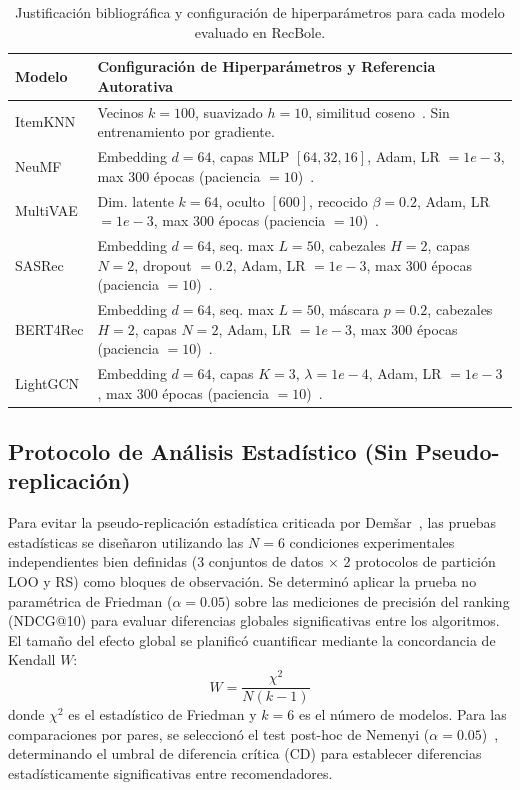 \documentclass[journal]{IEEEtran}
\makeatletter
\newcommand{\at}[1]{@#1}
\makeatother
\begin{document}
\begin{table}[h]
\centering
\caption{Justificación bibliográfica y configuración de hiperparámetros para cada modelo evaluado en RecBole.}
\label{tab:hyperparams}
\footnotesize
\setlength{\tabcolsep}{2.5pt}
\begin{tabular}{lp{5.5cm}}
\toprule
\textbf{Modelo} & \textbf{Configuración de Hiperparámetros y Referencia Autorativa} \\
\midrule
ItemKNN  & Vecinos $k=100$, suavizado $h=10$, similitud coseno~\cite{sarwar2001item}. Sin entrenamiento por gradiente. \\
NeuMF    & Embedding $d=64$, capas MLP $[64, 32, 16]$, Adam, LR $= 1e-3$, max 300 épocas (paciencia $= 10$)~\cite{he2017neural}. \\
MultiVAE & Dim. latente $k=64$, oculto $[600]$, recocido $\beta=0.2$, Adam, LR $= 1e-3$, max 300 épocas (paciencia $= 10$)~\cite{liang2018variational}. \\
SASRec   & Embedding $d=64$, seq. max $L=50$, cabezales $H=2$, capas $N=2$, dropout $= 0.2$, Adam, LR $= 1e-3$, max 300 épocas (paciencia $= 10$)~\cite{kang2018self}. \\
BERT4Rec & Embedding $d=64$, seq. max $L=50$, máscara $p=0.2$, cabezales $H=2$, capas $N=2$, Adam, LR $= 1e-3$, max 300 épocas (paciencia $= 10$)~\cite{sun2019bert4rec}. \\
LightGCN & Embedding $d=64$, capas $K=3$, $\lambda=1e-4$, Adam, LR $= 1e-3$, max 300 épocas (paciencia $= 10$)~\cite{he2020lightgcn}. \\
\bottomrule
\end{tabular}
\end{table}

\subsection{Protocolo de Análisis Estadístico (Sin Pseudo-replicación)}
Para evitar la pseudo-replicación estadística criticada por Demšar~\cite{demsar2006statistical}, las pruebas estadísticas se diseñaron utilizando las $N=6$ condiciones experimentales independientes bien definidas (3 conjuntos de datos $\times$ 2 protocolos de partición LOO y RS) como bloques de observación. Se determinó aplicar la prueba no paramétrica de Friedman ($\alpha = 0.05$) sobre las mediciones de precisión del ranking (NDCG\at{10}) para evaluar diferencias globales significativas entre los algoritmos. El tamaño del efecto global se planificó cuantificar mediante la concordancia de Kendall $W$:
\begin{equation}
W = \frac{\chi^2}{N(k - 1)}
\end{equation}
donde $\chi^2$ es el estadístico de Friedman y $k=6$ es el número de modelos. Para las comparaciones por pares, se seleccionó el test post-hoc de Nemenyi ($\alpha = 0.05$)~\cite{demsar2006statistical}, determinando el umbral de diferencia crítica (CD) para establecer diferencias estadísticamente significativas entre recomendadores.
\end{document}
